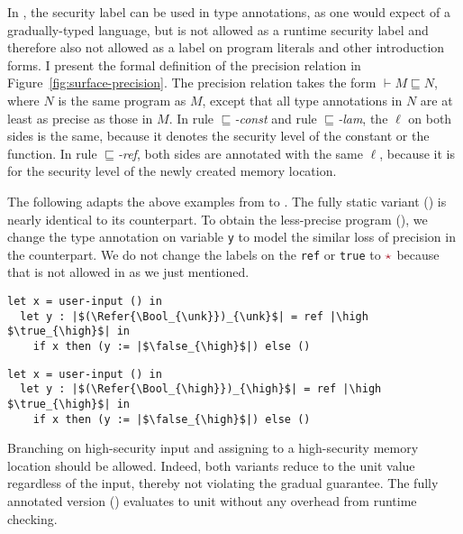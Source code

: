 In \Surface, the \unk security label can be used in type annotations, as one
would expect of a gradually-typed language, but \unk is not allowed as a runtime
security label and therefore also not allowed as a label on program literals and
other introduction forms. I present the formal definition of the precision
relation in Figure~\ref{fig:surface-precision}. The precision relation takes the
form $\vdash M \sqsubseteq N$, where $N$ is the same \Surface program as $M$,
except that all type annotations in $N$ are at least as precise as those in $M$.
In rule ${\sqsubseteq}$\textit{-const} and rule ${\sqsubseteq}$\textit{-lam},
the $\ell$ on both sides is the same, because it denotes the security level of
the constant or the function. In rule ${\sqsubseteq}$\textit{-ref}, both sides
are annotated with the same $\ell$, because it is for the security level of the
newly created memory location.

The following adapts the above examples from \GSLRef to \Surface. The fully
static variant () is nearly identical to its \GSLRef counterpart.
To obtain the less-precise program (), we change the type annotation
on variable \texttt{y} to model the similar loss of precision in the \GSLRef
counterpart. We do not change the labels on the \texttt{ref} or \texttt{true} to
$\unk$ because that is not allowed in \Surface as we just mentioned.

\noindent
{}
\begin{lstlisting}[style=tt,basicstyle=\ttfamily\footnotesize]
  let x = user-input () in
  let y : |$(\Refer{\Bool_{\unk}})_{\unk}$| = ref |\high $\true_{\high}$| in
    if x then (y := |$\false_{\high}$|) else ()
\end{lstlisting}
\noindent
{}
\begin{lstlisting}[style=tt,basicstyle=\ttfamily\footnotesize]
  let x = user-input () in
  let y : |$(\Refer{\Bool_{\high}})_{\high}$| = ref |\high $\true_{\high}$| in
    if x then (y := |$\false_{\high}$|) else ()
\end{lstlisting}

\noindent Branching on high-security input and assigning to a high-security
memory location should be allowed. Indeed, both variants reduce to the unit
value regardless of the input, thereby not violating the gradual guarantee. The
fully annotated version () evaluates to unit without any
overhead from runtime checking.

